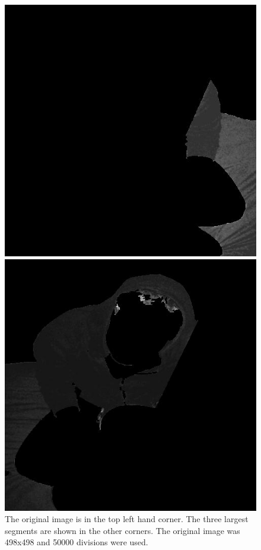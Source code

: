 \begin{figure}[ht]
\begin{minipage}[b]{0.47\linewidth}
\end{minipage}
\begin{minipage}[b]{0.47\linewidth}
\centering
\includegraphics[width=\textwidth]{MSTseg3.jpg}
\end{minipage}
\hspace{0.5cm}
\begin{minipage}[b]{0.47\linewidth}
\centering
\includegraphics[width=\textwidth]{MSTseg4.jpg}
\end{minipage}
\caption{The original image is in the top left hand corner. The three largest segments are shown in the other corners. The original image was 498x498 and 50000 divisions were used.}
\label{mst:segmented}
\end{figure}
\vfill 
